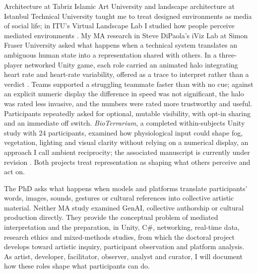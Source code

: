 Architecture at Tabriz Islamic Art University and landscape architecture at
Istanbul Technical University taught me to treat designed environments as
media of social life; in ITU's Virtual Landscape Lab I studied how people
perceive mediated environments \citep{jahandideh2023}. My MA research in
Steve DiPaola's iViz Lab at Simon Fraser University asked what happens when
a technical system translates an ambiguous human state into a representation
shared with others. In a three-player networked Unity game, each role
carried an animated halo integrating heart rate and heart-rate variability,
offered as a trace to interpret rather than a verdict
\citep{jahandideh_teammate_ms}. Teams supported a struggling
teammate faster than with no cue; against an explicit numeric display the
difference in speed was not significant, the halo was rated less invasive,
and the numbers were rated more trustworthy and useful. Participants
repeatedly asked for optional, mutable visibility, with opt-in sharing and an
immediate off switch. \emph{BioTerrarium}, a completed within-subjects
Unity study with 24 participants, examined how physiological input could
shape fog, vegetation, lighting and visual clarity without relying on a
numerical display, an approach I call ambient reciprocity; the associated
manuscript is currently under revision \citep{jahandideh_bioterrarium_ms}. Both projects treat
representation as shaping what others perceive and act on.

The PhD asks what happens when models and platforms translate participants'
words, images, sounds, gestures or cultural references into collective
artistic material. Neither MA study examined GenAI, collective authorship or
cultural production directly. They provide the conceptual problem of
mediated interpretation and the preparation, in Unity, C\#, networking,
real-time data, research ethics and mixed-methods studies, from which the
doctoral project develops toward artistic inquiry, participant observation
and platform analysis. As artist, developer, facilitator, observer, analyst
and curator, I will document how these roles shape what participants can do.
